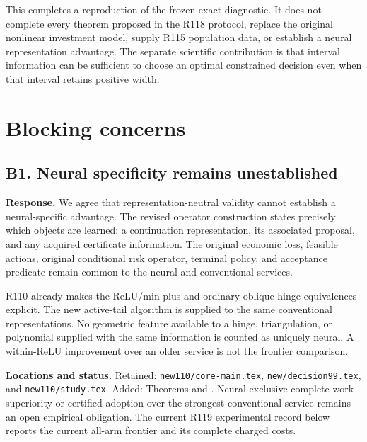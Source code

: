 This completes a reproduction of the frozen exact diagnostic. It does not complete every theorem proposed in the R118 protocol, replace the original nonlinear investment model, supply R115 population data, or establish a neural representation advantage. The separate scientific contribution is that interval information can be sufficient to choose an optimal constrained decision even when that interval retains positive width.

\hypertarget{blocking-concerns}{%
\section{Blocking concerns}\label{blocking-concerns}}

\hypertarget{b1.-neural-specificity-remains-unestablished}{%
\subsection{B1. Neural specificity remains unestablished}\label{b1.-neural-specificity-remains-unestablished}}

\textbf{Response.} We agree that representation-neutral validity cannot establish a neural-specific advantage. The revised operator construction states precisely which objects are learned: a continuation representation, its associated proposal, and any acquired certificate information. The original economic loss, feasible actions, original conditional risk operator, terminal policy, and acceptance predicate remain common to the neural and conventional services.

R110 already makes the ReLU/min-plus and ordinary oblique-hinge equivalences explicit. The new active-tail algorithm is supplied to the same conventional representations. No geometric feature available to a hinge, triangulation, or polynomial supplied with the same information is counted as uniquely neural. A within-ReLU improvement over an older service is not the frontier comparison.

\textbf{Locations and status.} Retained: \nolinkurl{new110/core-main.tex}, \nolinkurl{new/decision99.tex}, and \nolinkurl{new110/study.tex}. Added: Theorems  and . Neural-exclusive complete-work superiority or certified adoption over the strongest conventional service remains an open empirical obligation. The current R119 experimental record below reports the current all-arm frontier and its complete charged costs.

